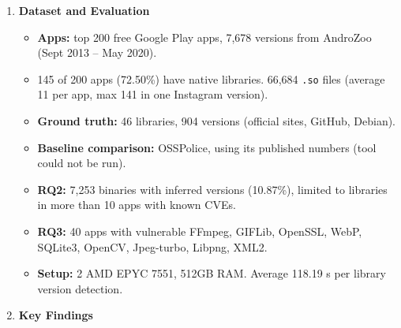 \documentclass[11pt,a4paper]{article}
\newcommand{\entrypart}[1]{\textbf{\color{accent}#1}\par\vspace{2pt}}
\begin{document}
\begin{enumerate}
    \item \entrypart{Dataset and Evaluation}

    \begin{itemize}
        \item \textbf{Apps:} top 200 free Google Play apps, 7,678 versions from AndroZoo (Sept 2013 -- May 2020).
        \item 145 of 200 apps (72.50\%) have native libraries. 66,684 \texttt{.so} files (average 11 per app, max 141 in one Instagram version).
        \item \textbf{Ground truth:} 46 libraries, 904 versions (official sites, GitHub, Debian).
        \item \textbf{Baseline comparison:} OSSPolice, using its published numbers (tool could not be run).
        \item \textbf{RQ2:} 7,253 binaries with inferred versions (10.87\%), limited to libraries in more than 10 apps with known CVEs.
        \item \textbf{RQ3:} 40 apps with vulnerable FFmpeg, GIFLib, OpenSSL, WebP, SQLite3, OpenCV, Jpeg-turbo, Libpng, XML2.
        \item \textbf{Setup:} 2 AMD EPYC 7551, 512GB RAM. Average 118.19 s per library version detection.
    \end{itemize}

    \item \entrypart{Key Findings}


\end{enumerate}
\end{document}
